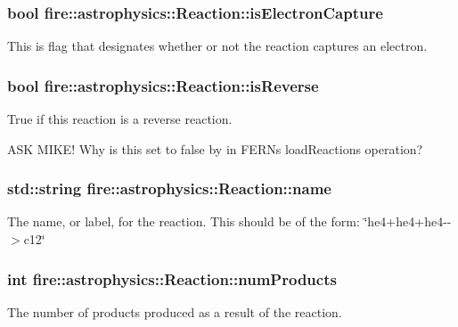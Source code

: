 \subsubsection[{\texorpdfstring{is\+Electron\+Capture}{isElectronCapture}}]{\setlength{\rightskip}{0pt plus 5cm}bool fire\+::astrophysics\+::\+Reaction\+::is\+Electron\+Capture}\hypertarget{a00022_a84165249a444a64bdfc41531fbe81cc0}{}\label{a00022_a84165249a444a64bdfc41531fbe81cc0}
This is flag that designates whether or not the reaction captures an electron. 
\subsubsection[{\texorpdfstring{is\+Reverse}{isReverse}}]{\setlength{\rightskip}{0pt plus 5cm}bool fire\+::astrophysics\+::\+Reaction\+::is\+Reverse}\hypertarget{a00022_ae161628da753400b3d2256e2d10a02b9}{}\label{a00022_ae161628da753400b3d2256e2d10a02b9}
True if this reaction is a reverse reaction.

A\+SK M\+I\+K\+E! Why is this set to false by in F\+E\+RN\textquotesingle{}s load\+Reactions operation? 
\subsubsection[{\texorpdfstring{name}{name}}]{\setlength{\rightskip}{0pt plus 5cm}std\+::string fire\+::astrophysics\+::\+Reaction\+::name}\hypertarget{a00022_abb359091e992ad4cb4cde0faacf6021b}{}\label{a00022_abb359091e992ad4cb4cde0faacf6021b}
The name, or label, for the reaction. This should be of the form\+: \char`\"{}he4+he4+he4-\/-\/$>$c12\char`\"{} 
\subsubsection[{\texorpdfstring{num\+Products}{numProducts}}]{\setlength{\rightskip}{0pt plus 5cm}int fire\+::astrophysics\+::\+Reaction\+::num\+Products}\hypertarget{a00022_aa59b550e5dbdd34c9c563e7dfc2cbc1e}{}\label{a00022_aa59b550e5dbdd34c9c563e7dfc2cbc1e}
The number of products produced as a result of the reaction. 

